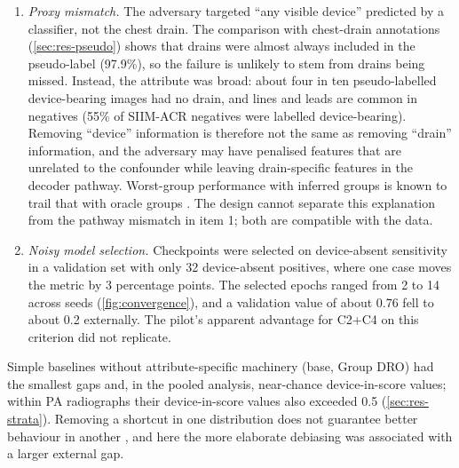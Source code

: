 \documentclass{ieeeaccess}
\begin{document}
\begin{enumerate}
  \item \emph{Proxy mismatch.} The adversary targeted ``any visible device'' predicted by a classifier, not the chest drain. The comparison with chest-drain annotations (\cref{sec:res-pseudo}) shows that drains were almost always included in the pseudo-label (97.9\%), so the failure is unlikely to stem from drains being missed. Instead, the attribute was broad: about four in ten pseudo-labelled device-bearing images had no drain, and lines and leads are common in negatives (55\% of SIIM-ACR negatives were labelled device-bearing). Removing ``device'' information is therefore not the same as removing ``drain'' information, and the adversary may have penalised features that are unrelated to the confounder while leaving drain-specific features in the decoder pathway. Worst-group performance with inferred groups is known to trail that with oracle groups \cite{han2024gic,liu2021jtt}. The design cannot separate this explanation from the pathway mismatch in item 1; both are compatible with the data.
  \item \emph{Noisy model selection.} Checkpoints were selected on device-absent sensitivity in a validation set with only 32 device-absent positives, where one case moves the metric by 3 percentage points. The selected epochs ranged from 2 to 14 across seeds (\cref{fig:convergence}), and a validation value of about 0.76 fell to about 0.2 externally. The pilot's apparent advantage for C2+C4 on this criterion did not replicate.
\end{enumerate}
Simple baselines without attribute-specific machinery (base, Group DRO) had the smallest gaps and, in the pooled analysis, near-chance device-in-score values; within PA radiographs their device-in-score values also exceeded 0.5 (\cref{sec:res-strata}). Removing a shortcut in one distribution does not guarantee better behaviour in another \cite{yang2024limits}, and here the more elaborate debiasing was associated with a larger external gap.
\end{document}
